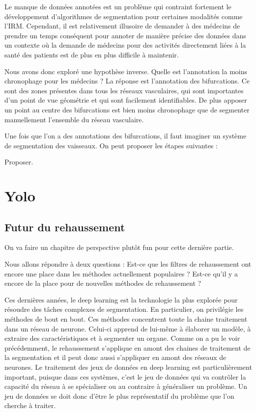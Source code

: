 
Le manque de données annotées est un problème qui contraint fortement le développement d'algorithmes de segmentation pour certaines modalités comme l'IRM. Cependant, il est relativement illusoire de demander à des médecins de prendre un temps conséquent pour annoter de manière précise des données dans un contexte où la demande de médecins pour des activités directement liées à la santé des patients est de plus en plus difficile à maintenir.

Nous avons donc exploré une hypothèse inverse. Quelle est l'annotation la moins chronophage pour les médecins ? La réponse est l'annotation des bifurcations. Ce sont des zones présentes dans tous les réseaux vasculaires, qui sont importantes d'un point de vue géométrie et qui sont facilement identifiables. De plus apposer un point au centre des bifurcations est bien moins chronophage que de segmenter manuellement l'ensemble du réseau vasculaire.

Une fois que l'on a des annotations des bifurcations, il faut imaginer un système de segmentation des vaisseaux. On peut proposer les étapes suivantes : 

Proposer.


\section{ Yolo }

\subsection{Futur du rehaussement}
On va faire un chapitre de perspective plutôt fun pour cette dernière partie.

Nous allons répondre à deux questions : Est-ce que les filtres de rehaussement ont encore une place dans les méthodes actuellement populaires ? Est-ce qu'il y a encore de la place pour de nouvelles méthodes de rehaussement ?

Ces dernières années, le deep learning est la technologie la plus explorée pour résoudre des tâches complexes de segmentation. En particulier,  on privilégie les méthodes de bout en bout. Ces méthodes concentrent toute la chaine traitement dans un réseau de neurone. Celui-ci apprend de lui-même à élaborer un modèle, à extraire des caractéristiques et à segmenter un organe. Comme on a pu le voir précédemment, le rehaussement s'applique en amont des chaines de traitement de la segmentation et il peut donc aussi s'appliquer en amont des réseaux de neurones. Le traitement des jeux de données en deep learning est particulièrement important, puisque dans ces systèmes, c'est le jeu de données qui va contrôler la capacité du réseau à se spécialiser ou au contraire à généraliser un problème. Un jeu de données se doit donc d'être le plus représentatif du problème que l'on cherche à traiter.

